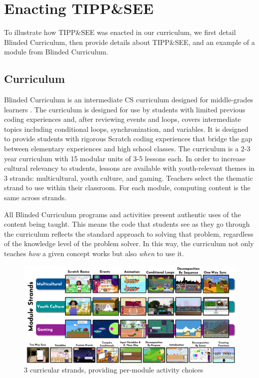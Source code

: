 \documentclass[sigconf,manuscript,review,anonymous]{acmart} %
\def\ts{TIPP\&SEE}
\def\umc{Use\begin{math}\rightarrow\end{math}Modify\begin{math}\rightarrow\end{math}Create\ }
\newcommand{\Scratchencore}[0]{Blinded Curriculum}
\begin{document}
\section{Enacting \ts{}}
To illustrate how \ts{} was enacted in our curriculum, we first detail \Scratchencore, then provide details about \ts{}, and an example of a module from \Scratchencore.

\subsection{Curriculum}
\Scratchencore{} is an intermediate CS curriculum designed for middle-grades learners \cite{authors}. %
The curriculum is designed for use by students with limited previous coding experiences and, after reviewing events and loops, covers intermediate topics including conditional loops, synchronization, and variables. It is designed to provide students with rigorous Scratch \cite{Maloney:2010} coding experiences that bridge the gap between elementary experiences and high school classes. The curriculum is a 2-3 year curriculum with 15 modular units of 3-5 lessons each. In order to increase cultural relevancy to students, lessons are available with youth-relevant themes in 3 strands: multicultural, youth culture, and gaming. Teachers select the thematic strand to use within their classroom. For each module, computing content is the same across strands.

All \Scratchencore{} programs and activities present authentic uses of the content being taught. This means the code that students see as they go through the curriculum reflects the standard approach to solving that problem, regardless of the knowledge level of the problem solver. In this way, the curriculum not only teaches \textit{how} a given concept works but also \textit{when} to use it. 

\begin{figure}
    \centering
    \includegraphics[width=\textwidth]{examples/EncoreStrands.png}
    \caption{3 curricular strands, providing per-module activity choices}
    \label{fig:my_label}
\end{figure}
\end{document}
